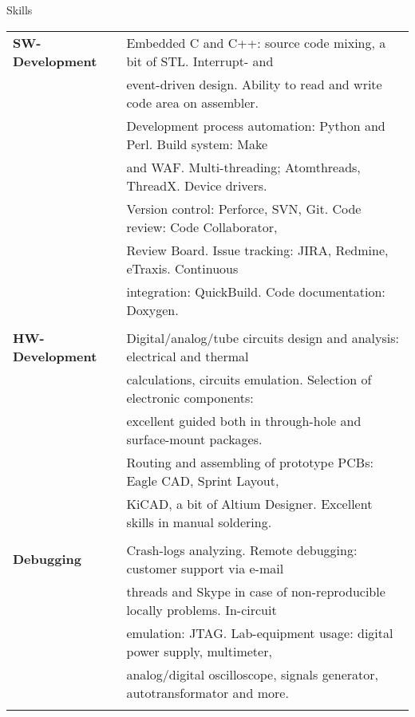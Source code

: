 \documentclass{template}
\begin{document}

\begin{rSection}{Skills}

\begin{tabular}{ @{} >{\bfseries}l @{\hspace{6ex}} l }
SW-Development  & Embedded C and C++: source code mixing, a bit of STL. Interrupt- and \\
                & event-driven design. Ability to read and write code area on assembler. \\
                & Development process automation: Python and Perl. Build system: Make \\
                & and WAF. Multi-threading; Atomthreads, ThreadX. Device drivers. \\
                & Version control: Perforce, SVN, Git. Code review: Code Collaborator, \\
                & Review Board. Issue tracking: JIRA, Redmine, eTraxis. Continuous \\
                & integration: QuickBuild. Code documentation: Doxygen. \\ \\

HW-Development  & Digital/analog/tube circuits design and analysis: electrical and thermal \\
                & calculations, circuits emulation. Selection of electronic components: \\
                & excellent guided both in through-hole and surface-mount packages. \\
                & Routing and assembling of prototype PCBs: Eagle CAD, Sprint Layout, \\
                & KiCAD, a bit of Altium Designer. Excellent skills in manual soldering. \\ \\

Debugging       & Crash-logs analyzing. Remote debugging: customer support via e-mail \\
                & threads and Skype in case of non-reproducible locally problems. In-circuit \\
                & emulation: JTAG. Lab-equipment usage: digital power supply, multimeter, \\
                & analog/digital oscilloscope, signals generator, autotransformator and more. \\ \\


\end{tabular}
\end{rSection}
\end{document}
